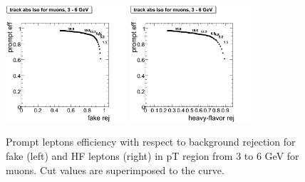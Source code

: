 \begin{figure}[htbp]
\begin{center}
 \includegraphics[width = 0.4\textwidth]{pictures/bkgdRej_sigEff/onlyTrack_muon_fake_ptCut0_ptCut1.png}
\includegraphics[width = 0.4\textwidth]{pictures/bkgdRej_sigEff/onlyTrack_muon_nonPrompt_ptCut0_ptCut1.png}
\caption{\small{Prompt leptons efficiency with respect to background 
rejection for fake (left) and HF leptons (right) in pT region
from 3 to 6 GeV for muons. 
Cut values are superimposed to the curve.}\label{fig:rej_mu1}}
\end{center}
\end{figure}
